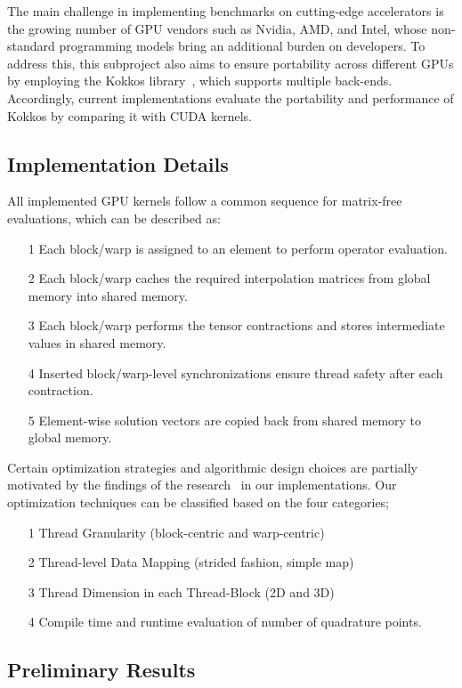 \documentclass[a4paper,12pt]{article}
\begin{document}
The main challenge in implementing benchmarks on cutting-edge accelerators is the growing number of GPU vendors such as Nvidia, AMD, and Intel, whose non-standard programming models bring an additional burden on developers. To address this, this subproject also aims to ensure portability across different GPUs by employing the Kokkos library~\cite{Trott2022}, which supports multiple back-ends. Accordingly, current implementations evaluate the portability and performance of Kokkos by comparing it with CUDA kernels.


\subsection{Implementation Details}

All implemented GPU kernels follow a common sequence for matrix-free evaluations, which can be described as:
\begin{itemize}
\item[1] Each block/warp is assigned to an element to perform operator evaluation.
\item [2] Each block/warp caches the required interpolation matrices from global memory into shared memory.
\item[3] Each block/warp performs the tensor contractions and stores intermediate values in shared memory.
\item[4] Inserted block/warp-level synchronizations ensure thread safety after each contraction.
\item[5] Element-wise solution vectors are copied back from shared memory to global memory.
\end{itemize}

Certain optimization strategies and algorithmic design choices are partially motivated by the findings of the research~\cite{Swiry2019} in our implementations. Our optimization techniques can be classified based on the four categories;
\begin{itemize}
\item[1] Thread Granularity (block-centric and warp-centric)
\item [2] Thread-level Data Mapping (strided fashion, simple map)
\item[3] Thread Dimension in each Thread-Block (2D and 3D)
\item[4] Compile time and runtime evaluation of number of quadrature points.
\end{itemize}

\subsection{Preliminary Results}
\end{document}

